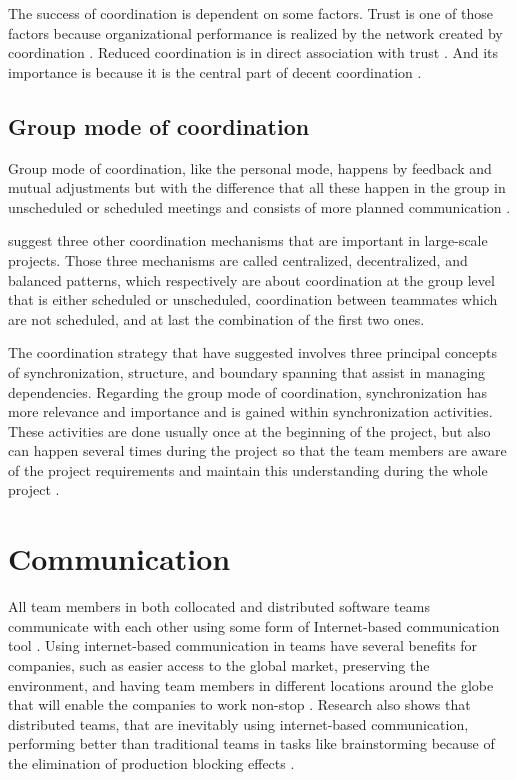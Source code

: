 The success of coordination is dependent on some factors. Trust is one of those factors because organizational performance is realized by the network created by coordination \citep{DeJong2016}. Reduced coordination is in direct association with trust \citep{RoohullahJan2016}. And its importance is because it is the central part of decent coordination \citep{Osifo2012}. 

\subsection{Group mode of coordination}
Group mode of coordination, like the personal mode, happens by feedback and mutual adjustments but with the difference that all these happen in the group in unscheduled or scheduled meetings and consists of more planned communication \citep{VanDeVen1976}.

\citet{Dietrich2013} suggest three other coordination mechanisms that are important in large-scale projects. Those three mechanisms are called centralized, decentralized, and balanced patterns, which respectively are about coordination at the group level that is either scheduled or unscheduled, coordination between teammates which are not scheduled, and at last the combination of the first two ones.

The coordination strategy that \citet{Strode2012} have suggested involves three principal concepts of synchronization, structure, and boundary spanning that assist in managing dependencies. Regarding the group mode of coordination, synchronization has more relevance and importance and is gained within synchronization activities. These activities are done usually once at the beginning of the project, but also can happen several times during the project so that the team members are aware of the project requirements and maintain this understanding during the whole project \citep{Strode2012}.

\section{Communication} \label{communication}
All team members in both collocated and distributed software teams communicate with each other using some form of Internet-based communication tool \citep{Kirkman2005}. Using internet-based communication in teams have several benefits for companies, such as easier access to the global market, preserving the environment, and having team members in different locations around the globe that will enable the companies to work non-stop \citep{Cascio2000}. Research also shows that distributed teams, that are inevitably using internet-based communication, performing better than traditional teams in tasks like brainstorming because of the elimination of production blocking effects \citep{Espinosa2015}.

